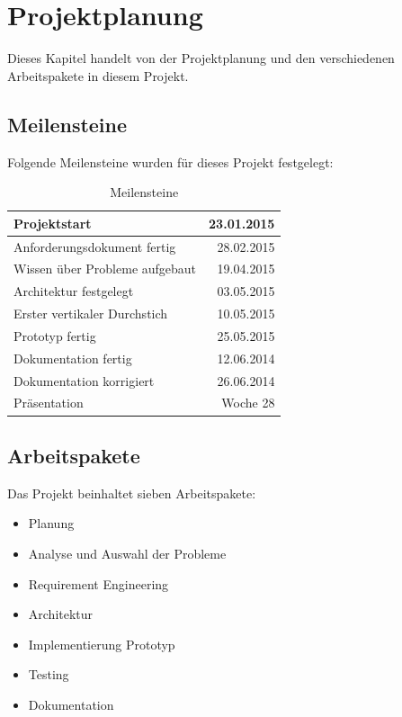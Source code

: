 %
%

\chapter{Projektplanung}\label{chap.projektplanung}
Dieses Kapitel handelt von der Projektplanung und den verschiedenen Arbeitspakete in diesem Projekt.

\section{Meilensteine}\label{meilensteine}
Folgende Meilensteine wurden für dieses Projekt festgelegt:

\begin{table}[ht]
\centering
  \begin{tabular}{ l | r }
	\hline
	\rowcolor{gray}
	\textbf{Projektstart}			&	\textbf{23.01.2015}\\ \hline
	Anforderungsdokument fertig		&	28.02.2015	\\ \hline
	Wissen über Probleme aufgebaut		&	19.04.2015	\\ \hline
	Architektur festgelegt			&	03.05.2015	\\ \hline
	Erster vertikaler Durchstich		& 	10.05.2015	\\ \hline
	Prototyp fertig				&	25.05.2015	\\ \hline
	Dokumentation fertig			&	12.06.2014	\\ \hline
	Dokumentation korrigiert			&	26.06.2014	\\ \hline
	Präsentation					&	Woche 28 \\ \hline
  \end{tabular}
   \caption{Meilensteine}\label{table:milestones}
\end{table}

\section{Arbeitspakete}\label{arbeitspakete}
Das Projekt beinhaltet sieben Arbeitspakete:
\begin{itemize}
\item Planung
\item Analyse und Auswahl der Probleme
\item Requirement Engineering
\item Architektur
\item Implementierung Prototyp
\item Testing
\item Dokumentation
\end{itemize}

